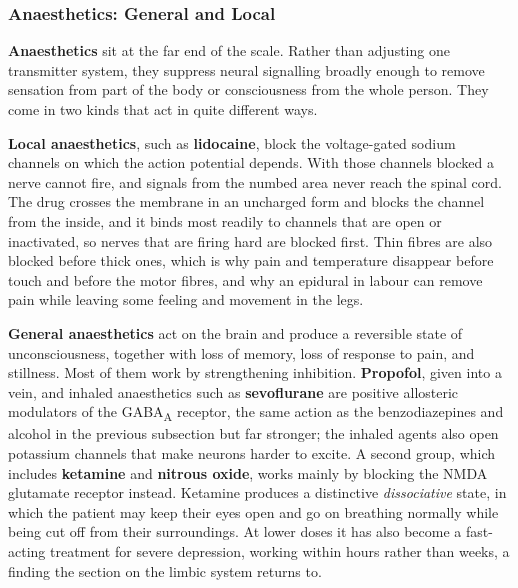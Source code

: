\documentclass[11pt]{article}
\begin{document}
\subsubsection{Anaesthetics: General and Local}

\textbf{Anaesthetics} sit at the far end of the scale. Rather than adjusting one transmitter system, they suppress neural signalling broadly enough to remove sensation from part of the body or consciousness from the whole person. They come in two kinds that act in quite different ways.

\textbf{Local anaesthetics}, such as \textbf{lidocaine}, block the voltage-gated sodium channels on which the action potential depends. With those channels blocked a nerve cannot fire, and signals from the numbed area never reach the spinal cord. The drug crosses the membrane in an uncharged form and blocks the channel from the inside, and it binds most readily to channels that are open or inactivated, so nerves that are firing hard are blocked first. Thin fibres are also blocked before thick ones, which is why pain and temperature disappear before touch and before the motor fibres, and why an epidural in labour can remove pain while leaving some feeling and movement in the legs.

\textbf{General anaesthetics} act on the brain and produce a reversible state of unconsciousness, together with loss of memory, loss of response to pain, and stillness. Most of them work by strengthening inhibition. \textbf{Propofol}, given into a vein, and inhaled anaesthetics such as \textbf{sevoflurane} are positive allosteric modulators of the GABA\textsubscript{A} receptor, the same action as the benzodiazepines and alcohol in the previous subsection but far stronger; the inhaled agents also open potassium channels that make neurons harder to excite. A second group, which includes \textbf{ketamine} and \textbf{nitrous oxide}, works mainly by blocking the NMDA glutamate receptor instead. Ketamine produces a distinctive \textit{dissociative} state, in which the patient may keep their eyes open and go on breathing normally while being cut off from their surroundings. At lower doses it has also become a fast-acting treatment for severe depression, working within hours rather than weeks, a finding the section on the limbic system returns to.
\end{document}
